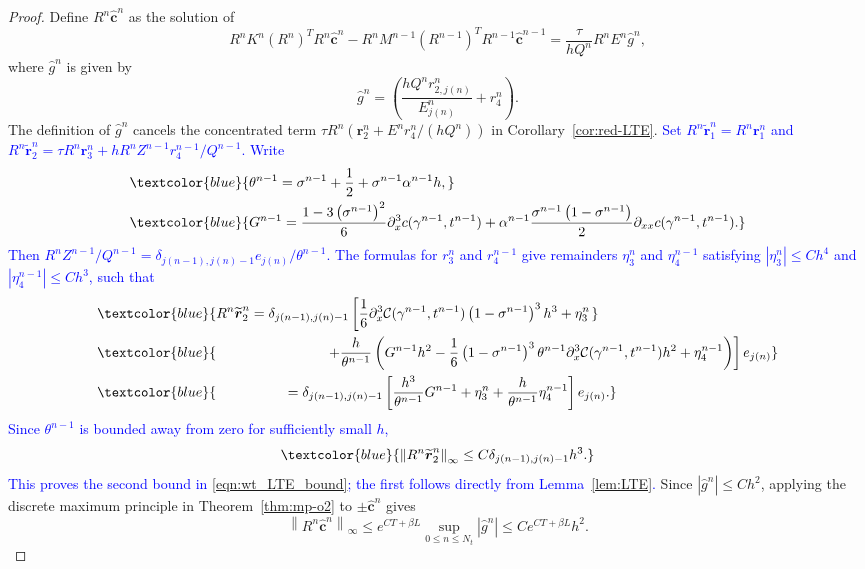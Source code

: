 \documentclass[11pt,reqno]{amsart}
\theoremstyle{plain}
\theoremstyle{definition}
\numberwithin{equation}{section}
\newcommand{\paren}[1]{\left(#1\right)}
\newcommand{\p}{\partial}
\newcommand{\wh}[1]{\widehat{#1}}
\newcommand{\wt}[1]{\widetilde{#1}}
\newcommand{\bm}[1]{\boldsymbol{#1}}
\newcommand{\abs}[1]{\left\lvert #1 \right\rvert}
\newcommand{\norm}[1]{\left\lVert #1 \right\rVert}
\newcommand{\Corr}{\mathcal C}
\begin{document}
\begin{proof}
Define $R^n\wh{\bm c}^n$ as the solution of
\begin{equation}
R^n K^n (R^n)^T R^n \wh{\bm c}^n - R^n M^{n-1}  (R^{n-1})^T R^{n-1} \wh{\bm c}^{n-1} =  \frac{ \tau}{h Q^n}R^nE^n \wh g^n,
\end{equation}
where $\wh g^n$ is given by
\begin{equation}
    \wh g^n = \paren{\frac{h Q^n  r_{2,j(n)}^n}{E_{j(n)}^n} + r_4^n} .
\end{equation}
The definition of $\wh g^n$ cancels the concentrated term
$\tau R^n(\bm r_2^n+E^nr_4^n/(hQ^n))$ in
Corollary~\ref{cor:red-LTE}.
\textcolor{blue}{Set $R^n\wt{\bm r}_1^n=R^n\bm r_1^n$ and
$R^n\wt{\bm r}_2^n=\tau R^n\bm r_3^n+
hR^nZ^{n-1}r_4^{n-1}/Q^{n-1}$. Write}
\begin{align*}
&\textcolor{blue}{\theta^{n-1}
=\sigma^{n-1}+\frac12+\sigma^{n-1}\alpha^{n-1}h,}\\
&\textcolor{blue}{G^{n-1}
=\frac{1-3\paren{\sigma^{n-1}}^2}{6}
\p_x^3c(\gamma^{n-1},t^{n-1})
+\alpha^{n-1}\frac{\sigma^{n-1}\paren{1-\sigma^{n-1}}}{2}
\p_{xx}c(\gamma^{n-1},t^{n-1}).}
\end{align*}
\textcolor{blue}{Then
$R^nZ^{n-1}/Q^{n-1}
=\delta_{j(n-1),j(n)-1}e_{j(n)}/\theta^{n-1}$.}
\textcolor{blue}{The formulas for $r_3^n$ and $r_4^{n-1}$ give remainders
$\eta_3^n$ and $\eta_4^{n-1}$ satisfying
$\abs{\eta_3^n}\le Ch^4$ and $\abs{\eta_4^{n-1}}\le Ch^3$, such that}
\begin{align*}
&\textcolor{blue}{R^n\wt{\bm r}_2^n
=\delta_{j(n-1),j(n)-1}\left[
\frac16\p_x^3\Corr(\gamma^{n-1},t^{n-1})
\paren{1-\sigma^{n-1}}^3h^3+\eta_3^n\right.}\\
&\textcolor{blue}{\left.\hspace{2.8cm}
+\frac{h}{\theta^{n-1}}\left(
G^{n-1}h^2
-\frac16\paren{1-\sigma^{n-1}}^3\theta^{n-1}
\p_x^3\Corr(\gamma^{n-1},t^{n-1})h^2
+\eta_4^{n-1}\right)\right]e_{j(n)}}\\
&\textcolor{blue}{\hspace{1.8cm}
=\delta_{j(n-1),j(n)-1}\left[
\frac{h^3}{\theta^{n-1}}G^{n-1}
+\eta_3^n+\frac{h}{\theta^{n-1}}\eta_4^{n-1}\right]e_{j(n)}.}
\end{align*}
\textcolor{blue}{Since $\theta^{n-1}$ is bounded away from zero for
sufficiently small $h$,}
\begin{equation*}
\textcolor{blue}{\norm{R^n\wt{\bm r}_2^n}_\infty
\le C\delta_{j(n-1),j(n)-1}h^3.}
\end{equation*}
\textcolor{blue}{This proves the second bound in}
\eqref{eqn:wt_LTE_bound}\textcolor{blue}{; the first follows directly from
Lemma~\ref{lem:LTE}.}
Since $\abs{\wh g^n} \le Ch^2$, applying the discrete maximum principle in Theorem~\ref{thm:mp-o2} to $\pm\wh{\bm c}^n$ gives
\begin{equation}
    \norm{R^n\wh{\bm c}^n}_\infty \le e^{CT+\beta L}\sup_{0\le n\le N_t}\abs{\wh g^n} \le Ce^{CT+\beta L} h^2.
\end{equation}

\end{proof}
\end{document}
